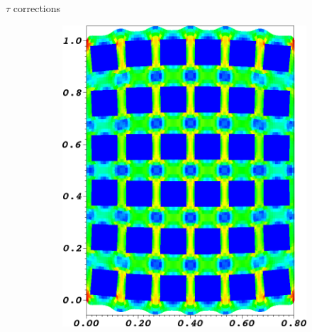 \documentclass{beamer}
\begin{document}
\begin{frame}{$\tau$ corrections}
  \begin{figure}
  \centering
  \begin{subfigure}[b]{0.18\textwidth}
    \includegraphics[width=\textwidth]{figures/MG/ElasticityCompressTrim}
  \end{subfigure} ~
  \begin{subfigure}[b]{0.18\textwidth}

\end{subfigure}
\end{figure}
\end{frame}
\end{document}
